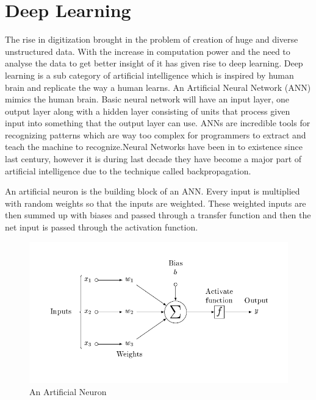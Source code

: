  




\clearpage
\section{Deep Learning} \label{sec:DeepLearning}

The rise in digitization brought in the problem of creation of huge and diverse unstructured data. With the increase in computation power and the need to analyse the data to get better insight of it has given rise to deep learning. Deep learning is a sub category of artificial intelligence which is inspired by human brain and replicate the way a human learns. An Artificial Neural Network (ANN) mimics the human brain. Basic neural network will have an input layer, one output layer along with a hidden layer consisting of units that process given input into something that the output layer can use.   ANNs are incredible tools for recognizing patterns which are way too complex for programmers to extract and teach the machine to recognize.Neural Networks have been in to existence since last century, however it is during last decade they have become a major part of artificial intelligence due to the technique called backpropagation.

An artificial neuron is the building block of an ANN. Every input is multiplied with random weights so that the inputs are weighted.  These weighted inputs are then summed up with biases and passed through a transfer function and then the net input is passed through the activation function.

\begin{figure}[!ht]
    \centering
    \captionsetup{justification=centering,margin=2cm}
    \includegraphics[width=12cm]{pics/ArtificialNeuronModel.png}
    \caption{An Artificial Neuron}
    \label{fig:neuron}
\end{figure}

